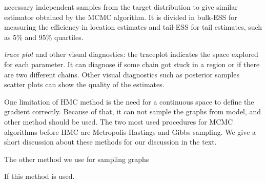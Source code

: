 \begin{alineas}
  necessary independent samples from the target distribution to give similar
  estimator obtained by the MCMC algorithm. It is divided in bulk-ESS for
  measuring the efficiency in location estimates and tail-ESS for tail
  estimates, such as 5\% and 95\% quartiles. 
  \item {\em trace plot} and other visual diagnostics: the traceplot indicates
  the space explored for each parameter. It can diagnose if some chain got
  stuck in a region or if there are two different chains. Other visual
  diagnostics such as posterior samples scatter plots can show the quality of
  the estimates.
\end{alineas}

One limitation of HMC method is the need for a continuous space to define 
the gradient correctly. Because of that, it can not sample the graphs from 
\textcite{crawford2016} model, and other method should be used. The two most
used procedures for MCMC algorithms before HMC are Metropolis-Hastings and
Gibbs sampling. We give a short discussion about these methods for our
discussion in the text. 

The other method we use for sampling graphs

If this method is used. 